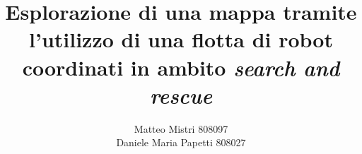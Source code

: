 \documentclass[a4paper,12pt]{report} %
\begin{document}
 

\title{Esplorazione di una mappa tramite l'utilizzo di una flotta di robot coordinati in ambito \textit{search and rescue}} 
\author{Matteo Mistri 808097\\ Daniele Maria Papetti 808027}

\maketitle
\tableofcontents







\end{document}
